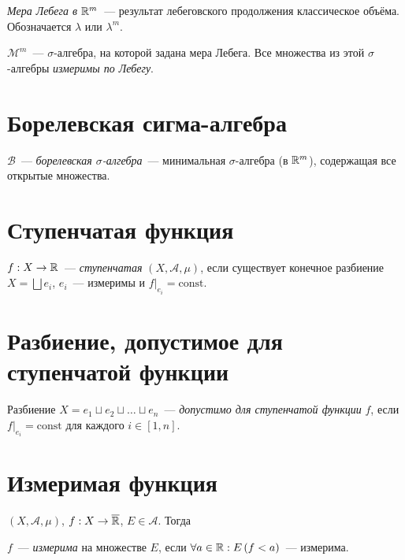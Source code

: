 \documentclass{article}
\begin{document}
        \textit{Мера Лебега в $\mathbb{R}^m$}~--- результат лебеговского продолжения классическое объёма. Обозначается $\lambda$ или $\lambda^m$.
        
        $\mathcal{M}^m$~--- $\sigma$-алгебра, на которой задана мера Лебега. Все множества из этой $\sigma$-алгебры \textit{измеримы по Лебегу}.
        
    \newpage
    
    \section{Борелевская сигма-алгебра}
    
        $\mathcal{B}$~--- \textit{борелевская $\sigma$-алгебра}~--- минимальная $\sigma$-алгебра (в $\mathbb{R}^m$), содержащая все открытые множества.
        
    \newpage
    
    \section{Ступенчатая функция}
    
        $f : X \rightarrow \mathbb{R}$~--- \textit{ступенчатая} $\left( X, \mathcal{A}, \mu \right)$, если существует конечное разбиение $X = \bigsqcup e_i$, $e_i$~--- измеримы и $f \big|_{e_i} = \mathrm{const}$.
        
    \newpage
    
    \section{Разбиение, допустимое для ступенчатой функции}
    
        Разбиение $X = e_1 \sqcup e_2 \sqcup \ldots \sqcup e_n$~--- \textit{допустимо для ступенчатой функции} $f$, если $f \big|_{e_i} = \mathrm{const}$ для каждого $i \in [1, n]$.
        
    \newpage
    
    \section{Измеримая функция}
    
        $\left( X, \mathcal{A}, \mu \right)$, $f : X \rightarrow \overline{\mathbb{R}}$, $E \in \mathcal{A}$. Тогда
        
        $f$~--- \textit{измерима} на множестве $E$, если $\forall a \in \mathbb{R} : E \left(f < a \right)$~--- измерима.
        
    \newpage
    
\end{document}
